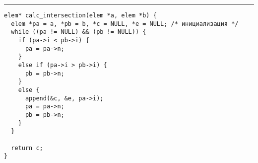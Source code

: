 \documentclass{article}
\begin{document}
\lstset{language = C,
    extendedchars = \true,
    keepspaces = true,
    breaklines=true,
    frame=lines}
\hrule
\begin{lstlisting}[title=\textbf {Алгоритм 1.7} Вычисление пересечения слиянием]
elem* calc_intersection(elem *a, elem *b) {
  elem *pa = a, *pb = b, *c = NULL, *e = NULL; /* инициализация */
  while ((pa != NULL) && (pb != NULL)) {
    if (pa->i < pb->i) {
      pa = pa->n;
    }
    else if (pa->i > pb->i) {
      pb = pb->n;
    }
    else {
      append(&c, &e, pa->i);
      pa = pa->n;
      pb = pb->n;
    }
  }

  return c;
}
\end{lstlisting}
\end{document}
